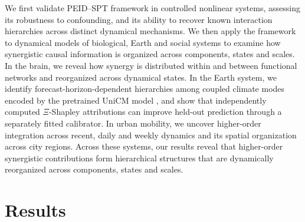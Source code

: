 \documentclass[fleqn,10pt]{wlscirep}
\theoremstyle{naturetheorem}
\begin{document}
We first validate PEID--SPT framework in controlled nonlinear systems, assessing its robustness to confounding, and its ability to recover known interaction hierarchies across distinct dynamical mechanisms. We then apply the framework to dynamical models of biological, Earth and social systems to examine how synergistic causal information is organized across components, states and scales. In the brain, we reveal how synergy is distributed within and between functional networks and reorganized across dynamical states. In the Earth system, we identify forecast-horizon-dependent hierarchies among coupled climate modes encoded by the pretrained UniCM model \cite{yuan2026learning}, and show that independently computed $\Xi$-Shapley attributions can improve held-out prediction through a separately fitted calibrator. In urban mobility, we uncover higher-order integration across recent, daily and weekly dynamics and its spatial organization across city regions. Across these systems, our results reveal that higher-order synergistic contributions form hierarchical structures that are dynamically reorganized across components, states and scales.


\section*{Results}
\end{document}
